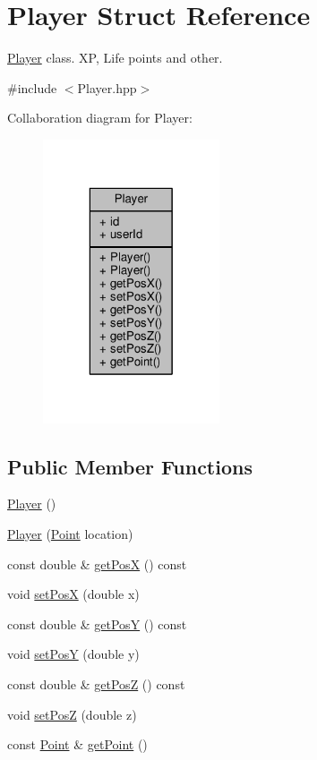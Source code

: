 \hypertarget{struct_player}{\section{Player Struct Reference}
\label{struct_player}
}


\hyperlink{struct_player}{Player} class. X\-P, Life points and other.  




{\ttfamily \#include $<$Player.\-hpp$>$}



Collaboration diagram for Player\-:
\nopagebreak
\begin{figure}[H]
\begin{center}
\leavevmode
\includegraphics[width=148pt]{struct_player__coll__graph}
\end{center}
\end{figure}
\subsection*{Public Member Functions}
\begin{DoxyCompactItemize}
\item 
\hyperlink{struct_player_affe0cc3cb714f6deb4e62f0c0d3f1fd8}{Player} ()
\item 
\hyperlink{struct_player_ad1c9500a9f02f1055209e1d0e33e27e5}{Player} (\hyperlink{struct_point}{Point} location)
\item 
const double \& \hyperlink{struct_player_a34371ed01e0f407e8b3dd47d5eb6a248}{get\-Pos\-X} () const 
\item 
void \hyperlink{struct_player_ae5aa5be871fe72f9020980ad83f963c1}{set\-Pos\-X} (double x)
\item 
const double \& \hyperlink{struct_player_a79192b1280def72414767ed9cb15f9ce}{get\-Pos\-Y} () const 
\item 
void \hyperlink{struct_player_ab7214ba1c1d38aeb5676a8cf9f5473fe}{set\-Pos\-Y} (double y)
\item 
const double \& \hyperlink{struct_player_a08fa9b861a53c027a49e709c32577fe7}{get\-Pos\-Z} () const 
\item 
void \hyperlink{struct_player_a265ea0b3d9627fb6f9e65dfb3aed66f7}{set\-Pos\-Z} (double z)
\item 
const \hyperlink{struct_point}{Point} \& \hyperlink{struct_player_a46ea235260e1fee6f208e4bf3c82b25b}{get\-Point} ()
\end{DoxyCompactItemize}
